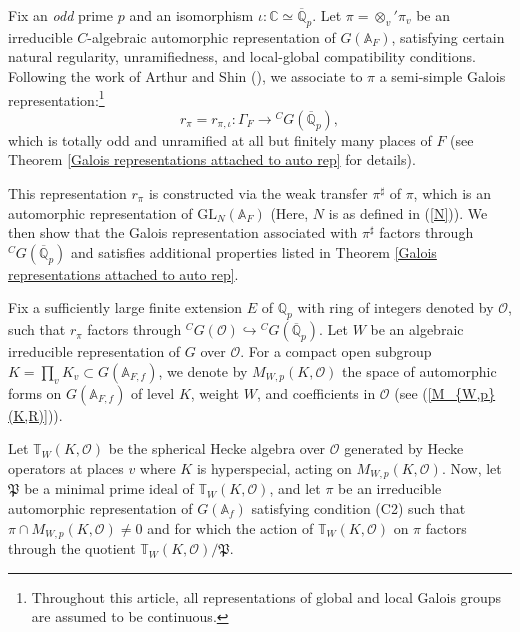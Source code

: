 \documentclass[12pt,oneside,reqno]{amsart}
\newcommand{\A}{\mathbb{A}}
\theoremstyle{plain}
\begin{document}
	
	
	
	
	Fix an \emph{odd} prime $p$ and an isomorphism $\iota \colon \mathbb{C} \simeq \overline{\mathbb{Q}}_p$. Let $\pi=\otimes_v'\pi_v$ be an irreducible $C$-algebraic automorphic representation of $G(\A_F)$, satisfying certain natural regularity, unramifiedness, and local-global compatibility conditions. Following the work of Arthur and Shin (\cite{Arthur2013,Shin2024}), we associate to $\pi$ a semi-simple Galois representation:\footnote{Throughout this article, all representations of global and local Galois groups are assumed to be continuous.}  
	\[
	r_\pi = r_{\pi, \iota} \colon \Gamma_F \to {}^C G (\overline{\mathbb{Q}}_p),
	\]  
	which is totally odd and unramified at all but finitely many places of $F$ (see Theorem \ref{Galois representations attached to auto rep} for details).
	
	
	
	This representation $r_\pi$ is constructed via the weak transfer $\pi^\sharp$ of $\pi$, which is an automorphic representation of $\mathrm{GL}_N(\mathbb{A}_F)$ (Here, $N$ is as defined in (\ref{N})). We then show that the Galois representation associated with $\pi^\sharp$ factors through ${}^C G (\overline{\mathbb{Q}}_p)$ and satisfies additional properties listed in Theorem \ref{Galois representations attached to auto rep}.
	
	
	
	Fix a sufficiently large finite extension $E$ of $\mathbb{Q}_p$ with ring of integers denoted by $\mathcal{O}$, such that $r_\pi$ factors through ${}^C G(\mathcal{O}) \hookrightarrow {}^C G(\overline{\mathbb{Q}}_p)$. Let $W$ be an algebraic irreducible representation of $G$ over $\mathcal{O}$. For a compact open subgroup $K=\prod_vK_v\subset G(\mathbb{A}_{F,f})$, we denote by $M_{W,p}(K, \mathcal{O})$ the space of automorphic forms on $G(\mathbb{A}_{F,f})$ of level $K$, weight $W$, and coefficients in $\mathcal{O}$ (see (\ref{M_{W,p}(K,R)})).  
	
	Let $\mathbb{T}_W(K, \mathcal{O})$ be the spherical Hecke algebra over $\mathcal{O}$ generated by Hecke operators at places $v$ where $K$ is hyperspecial, acting on $M_{W,p}(K, \mathcal{O})$. Now, let $\mathfrak{P}$ be a minimal prime ideal of $\mathbb{T}_W(K, \mathcal{O})$, and let $\pi$ be an irreducible automorphic representation of $G(\mathbb{A}_f)$ satisfying condition (C2) such that $\pi\cap M_{W,p}(K, \mathcal{O})\neq0$ and for which the action of $\mathbb{T}_W(K, \mathcal{O})$ on $\pi$ factors through the quotient $\mathbb{T}_W(K, \mathcal{O}) / \mathfrak{P}$.  
	
\end{document}
